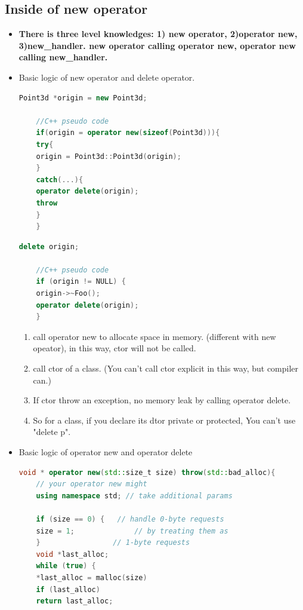 \documentclass[a4paper,11pt,twoside]{book}
\begin{document}
\subsection{Inside of new operator}
\begin{itemize}
	\item \textbf{There is three level knowledges: 1) new operator, 2)operator new, 3)new\_handler. new operator calling operator new, operator new calling new\_handler.} 
	
	\item Basic logic of new operator and delete operator.
	\begin{lstlisting}[frame=single, language=c++]
	Point3d *origin = new Point3d;
	
	//C++ pseudo code
	if(origin = operator new(sizeof(Point3d))){
	try{
	origin = Point3d::Point3d(origin);
	}
	catch(...){
	operator delete(origin);
	throw
	}
	}
	\end{lstlisting}
	
	\begin{lstlisting}[frame=single, language=c++]
	delete origin;
	
	//C++ pseudo code
	if (origin != NULL) {
	origin->~Foo();
	operator delete(origin);
	}
	\end{lstlisting}
	
	\begin{enumerate}
		\item call operator new to allocate space in memory. (different with new opeator), in this way, ctor will not be called.
		\item call ctor of a class. (You can't call ctor explicit in this way, but compiler can.)
		\item If ctor throw an exception, no memory leak by calling operator delete.
		
		\item So for a class, if you declare its dtor private or protected, You can't use "delete p".
	\end{enumerate}
	
	
	\item Basic logic of operator new and operator delete
	\begin{lstlisting}[frame=single, language=c++]
	void * operator new(std::size_t size) throw(std::bad_alloc){
	// your operator new might
	using namespace std; // take additional params
	
	if (size == 0) {   // handle 0-byte requests
	size = 1;              // by treating them as
	}                 // 1-byte requests
	void *last_alloc;
	while (true) {
	*last_alloc = malloc(size)
	if (last_alloc)
	return last_alloc;
	

\end{lstlisting}
\end{itemize}
\end{document}
